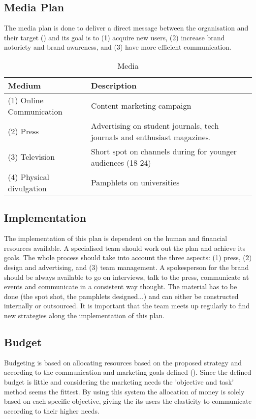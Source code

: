 \documentclass[12pt]{article}
\begin{document}
\subsection{Media Plan}
The media plan is done to deliver a direct message between the organisation and their target (\cite{clow}) and its goal is to (1) acquire new users, (2) increase brand notoriety and brand awareness, and (3) have more efficient communication.

\begin{table}[htbp]
\small
\caption{Media}
\label{table:media}
\centering
\begin{tabular}{ @{}P{0.3\textwidth}P{0.67\textwidth}@{} }
Medium	&	Description	\\ \hline
 (1) Online Communication	&	Content marketing campaign \\
 (2) Press	&	Advertising on student journals, tech journals and enthusiast magazines.\\
 (3) Television	&	Short spot on channels during for younger audiences (18-24) \\
 (4) Physical divulgation &  Pamphlets on universities   \\
 \hline
\end{tabular}
\end{table}


\subsection{Implementation}
The implementation of this plan is dependent on the human and financial resources available. A specialised team should work out the plan and achieve its goals. The whole process should take into account the three aspects: (1) press, (2) design and advertising, and (3) team management. A spokesperson for the brand should be always available to go on interviews, talk to the press, communicate at events and communicate in a consistent way thought. The material has to be done (the spot shot, the pamphlets designed...) and can either be constructed internally or outsourced. It is important that the team meets up regularly to find new strategies along the implementation of this plan.

\subsection{Budget}

Budgeting is based on allocating resources based on the proposed strategy and according to the communication and marketing goals defined (\cite{clow}). Since the defined budget is little and considering the marketing needs the 'objective and task' method seems the fittest. By using this system the allocation of money is solely based on each specific objective, giving the its users the elasticity to communicate according to their higher needs. 
\end{document}
